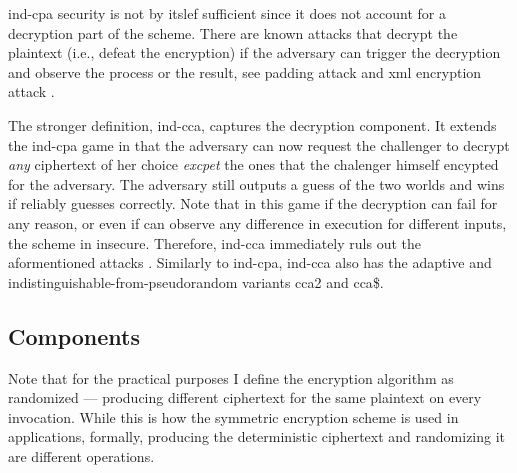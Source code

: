 			\acrshort{ind-cpa} security is not by itslef sufficient since it does not account for a decryption part of the scheme.
			There are known attacks that decrypt the plaintext (i.e., defeat the encryption) if the adversary can trigger the decryption and observe the process or the result, see padding attack \cite{padding-attack} and \acrshort{xml} encryption attack \cite{xml-break-encryption}.

			The stronger definition, \acrfull{ind-cca}, captures the decryption component.
			It extends the \acrshort{ind-cpa} game in that the adversary can now request the challenger to decrypt \emph{any} ciphertext of her choice \emph{excpet} the ones that the chalenger himself encypted for the adversary.
			The adversary still outputs a guess of the two worlds and wins if reliably guesses correctly.
			Note that in this game if the decryption can fail for any reason, or even if \adversary{} can observe any difference in execution for different inputs, the scheme in insecure.
			Therefore, \acrshort{ind-cca} immediately ruls out the aformentioned attacks \cite{padding-attack,xml-break-encryption}.
			Similarly to \acrshort{ind-cpa}, \acrshort{ind-cca} also has the adaptive and indistinguishable\hyp{}from\hyp{}pseudorandom variants \acrshort{cca}2 and \acrshort{cca}\$.

		\subsection{Components}

			Note that for the practical purposes I define the encryption algorithm as randomized --- producing different ciphertext for the same plaintext on every invocation.
			While this is how the symmetric encryption scheme is used in applications, formally, producing the deterministic ciphertext and randomizing it are different operations.

